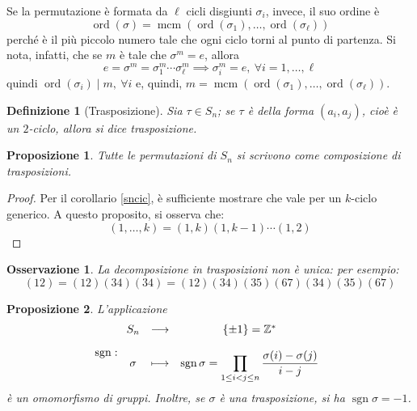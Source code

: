 \documentclass[11pt]{article}
\theoremstyle{style}
\newtheorem{definizione}{Definizione}[section]
\newtheorem{prop}{Proposizione}[section]
\newtheorem{osservazione}{Osservazione}[section]
\numberwithin{equation}{subsection}
\begin{document}
Se la permutazione \`e formata da $\ell $ cicli disgiunti $\sigma _i$, invece, il suo ordine \`e 
\[
\operatorname{ord}(\sigma ) = \operatorname{mcm} (\operatorname{ord}(\sigma_1) , \ldots, \operatorname{ord}(\sigma _\ell ) )
\] 
perch\'e \`e il pi\`u piccolo numero tale che ogni ciclo torni al punto di partenza.
Si nota, infatti, che se $m$ \`e tale che $\sigma ^m = e$, allora
\[
	e = \sigma  ^m  = \sigma_1 ^m \cdots \sigma _\ell ^m \implies \sigma _i^m = e , \ \forall i=1,\ldots,\ell 
\] 
quindi $\operatorname{ord}(\sigma _i)  \mid m, \ \forall i$ e, quindi, $m=\operatorname{mcm} (\operatorname{ord}(\sigma _1) ,\ldots,\operatorname{ord}(\sigma _\ell ) )$.
\begin{definizione}
	[Trasposizione]
	Sia $\tau \in S_n$; se $\tau $ \`e della forma $(a_i,a_j)$, cio\`e \`e un $2$-ciclo, allora si dice \textit{trasposizione}.
\end{definizione}
\begin{prop}
	Tutte le permutazioni di $S_n$ si scrivono come composizione di trasposizioni. 
\end{prop}
	\begin{proof}
		Per il corollario \ref{sncic}, \`e sufficiente mostrare che vale per un $k$-ciclo generico. 
		A questo proposito, si osserva che:
		\[
			(1,\ldots,k)= (1,k) (1,k-1)\cdots (1,2)
		\] 
	\end{proof}
\begin{osservazione}
La decomposizione in trasposizioni non \`e unica: per esempio:
\[
	(12) = (12)(34)(34) = (12)(34)(35)(67)(34)(35)(67)
\] 
\end{osservazione}
\begin{prop}
	L'applicazione 
	\[
	\operatorname{sgn} :
	\begin{array}
		{c c c}
		S_n & \longrightarrow & \left\{ \pm 1 \right\} = \mathbb{Z}^*\\
		\\
		\sigma & \longmapsto & \operatorname{sgn} \sigma =\displaystyle  \prod_{1\le i< j\le n} \frac{\sigma (i) - \sigma (j)}{i-j}
	\end{array}
	\] 
	\`e un omomorfismo di gruppi. 
	Inoltre, se $\sigma $ \`e una trasposizione, si ha $\operatorname{sgn} \sigma = -1$.
\end{prop}
\end{document}
